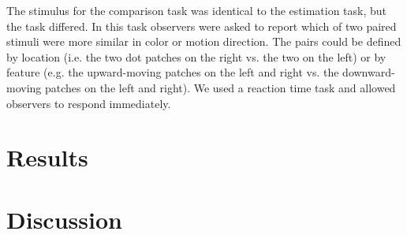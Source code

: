 The stimulus for the comparison task was identical to the estimation task, but the task differed. In this task observers were asked to report which of two paired stimuli were more similar in color or motion direction. The pairs could be defined by location (i.e. the two dot patches on the right vs. the two on the left) or by feature (e.g. the upward-moving patches on the left and right vs. the downward-moving patches on the left and right). We used a reaction time task and allowed observers to respond immediately. 

\section{Results}



\section{Discussion}

